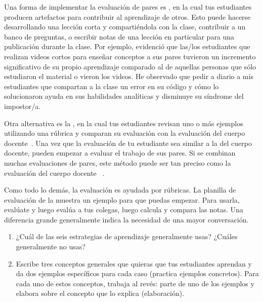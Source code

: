 Una forma de implementar la evaluación de pares es ,
en la cual tus estudiantes producen artefactos para contribuir al aprendizaje de otros.
Esto puede hacerse desarrollando una lección corta y compartiéndola con la clase,
contribuir a un banco de preguntas,
o escribir notas de una lección en particular para una publicación durante la clase.
Por ejemplo,
\cite{Fran2018} evidenció que las/los estudiantes que realizan videos cortos para enseñar conceptos a sus pares
tuvieron un incremento significativo de su propio aprendizaje
comparado al de aquellas personas que sólo estudiaron el material o vieron los videos.
He observado que pedir a diario a mis estudiantes que compartan a la clase un error en su código y cómo lo solucionaron ayuda en sus habilidades analíticas y disminuye su síndrome del impostor/a.

Otra alternativa es la ,
en la cual tus estudiantes revisan uno o más ejemplos utilizando una rúbrica
y comparan su evaluación con la evaluación del cuerpo docente~\cite{Kulk2013}.
Una vez que la evaluación de tu estudiante sea similar a la del cuerpo docente,
pueden empezar a evaluar el trabajo de sus pares.
Si se combinan muchas evaluaciones de pares,
este método puede ser tan preciso como la evaluación del cuerpo docente ~\cite{Pare2008}.

Como todo lo demás,
la evaluación es ayudada por rúbricas.
La planilla de evaluación de la  muestra un ejemplo para que puedas empezar.
Para usarla,
evalúate y luego evalúa a tus colegas,
luego calcula y compara las notas.
Una diferencia grande generalmente indica la necesidad de una mayor conversación.



\begin{enumerate}

\item
  ¿Cuál de las seis estrategias de aprendizaje generalmente usas?
  ¿Cuáles generalmente no usas?

\item
  Escribe tres conceptos generales que quieras que tus estudiantes aprendan
  y da dos ejemplos específicos para cada caso
  (practica ejemplos concretos).
  Para cada uno de estos conceptos,
  trabaja al revés: parte de uno de los ejemplos y elabora sobre el concepto que lo explica
  (elaboración).

\end{enumerate}

